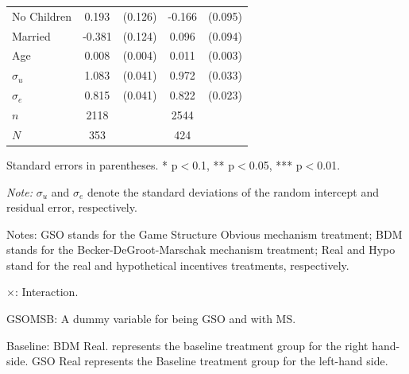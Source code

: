 \documentclass[12pt]{article}
\newcommand{\sym}[1]{\rlap{$^{#1}$}}
\begin{document}
\begin{table}[H]
{\begin{tabular}{l*{2}{cc}}
No Children &       0.193         &     (0.126)&      -0.166\sym{*}  &     (0.095)\\
Married     &      -0.381\sym{***}&     (0.124)&       0.096         &     (0.094)\\
Age         &       0.008\sym{**} &     (0.004)&       0.011\sym{***}&     (0.003)\\
$\sigma_u$     &       1.083\sym{***}&     (0.041)&       0.972\sym{***}&     (0.033)\\
$\sigma_e$     &       0.815\sym{***}&     (0.041)&       0.822\sym{***}&     (0.023)\\
\hline
\(n\)       &        2118         &            &        2544         &            \\
\(N\)       &        353        &            &        424         &            \\
\hline \hline
\end{tabular}
}


\begin{tablenotes}
            \footnotesize
            \item Standard errors in parentheses. * p$<$0.1, ** p$<$0.05, *** p$<$0.01.
            \item \textit{Note:} $\sigma_u$ and $\sigma_e$ denote the standard deviations of the random intercept and residual error, respectively.
            \item Notes: GSO stands for the Game Structure Obvious mechanism treatment; BDM stands for the Becker-DeGroot-Marschak mechanism treatment; Real and Hypo stand for the real and hypothetical incentives treatments, respectively.
           \item $\times$: Interaction.
           \item GSOMSB: A dummy variable for being GSO and with MS.
           \item Baseline: BDM Real. represents the baseline treatment group for the right hand-side.
           GSO Real represents the Baseline treatment group for the left-hand side.
        \end{tablenotes}
\end{table}


\clearpage




\begin{table}[htbp!]
    \centering
    \caption{Game form recognition}
    \label{tab:Appendix_gameform}
\end{table}
\end{document}

